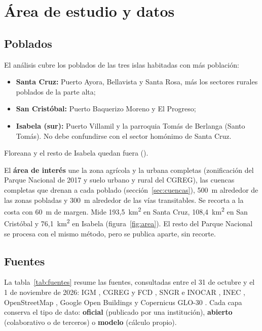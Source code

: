 \documentclass{sosg-informe}
\newcommand{\kmc}{km\textsuperscript{2}}
\begin{document}
\section{Área de estudio y datos}

\subsection{Poblados}
El análisis cubre los poblados de las tres islas habitadas con más población:
\begin{itemize}
  \item \textbf{Santa Cruz:} Puerto Ayora, Bellavista y Santa Rosa, más los sectores rurales poblados de la parte alta;
  \item \textbf{San Cristóbal:} Puerto Baquerizo Moreno y El Progreso;
  \item \textbf{Isabela (sur):} Puerto Villamil y la parroquia Tomás de Berlanga (Santo Tomás). No debe confundirse con el sector homónimo de Santa Cruz.
\end{itemize}
Floreana y el resto de Isabela quedan fuera ().

El \textbf{área de interés} une la zona agrícola y la urbana completas (zonificación del Parque Nacional de 2017 y suelo urbano y rural del CGREG), las cuencas completas que drenan a cada poblado (sección~\ref{sec:cuencas}), 500~m alrededor de las zonas pobladas y 300~m alrededor de las vías transitables. Se recorta a la costa con 60~m de margen. Mide 193,5~\kmc{} en Santa Cruz, 108,4~\kmc{} en San Cristóbal y 76,1~\kmc{} en Isabela (figura~\ref{fig:area}). El resto del Parque Nacional se procesa con el mismo método, pero se publica aparte, sin recorte.

\subsection{Fuentes}
La tabla~\ref{tab:fuentes} resume las fuentes, consultadas entre el 31 de octubre y el 1 de noviembre de 2026: IGM \citep{igm25k}, CGREG y FCD \citep{cgreg2017}, SNGR e INOCAR \citep{sngr2026}, INEC \citep{inec2026}, OpenStreetMap \citep{osm2026}, Google Open Buildings \citep{sirko2021} y Copernicus GLO-30 \citep{esa2021}. Cada capa conserva el tipo de dato: \textbf{oficial} (publicado por una institución), \textbf{abierto} (colaborativo o de terceros) o \textbf{modelo} (cálculo propio).
\end{document}
